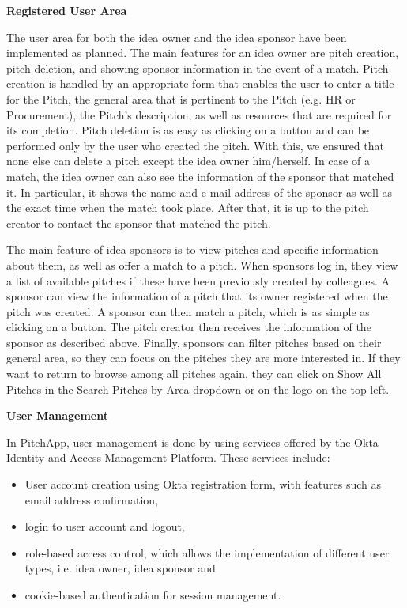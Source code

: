 \textbf{Registered User Area}

The user area for both the idea owner and the idea sponsor have been implemented as planned. The main features for an idea owner are pitch creation, pitch deletion, and showing sponsor information in the event of a match.
Pitch creation is handled by an appropriate form that enables the user to enter a title for the Pitch, the general area that is pertinent to the Pitch (e.g. HR or Procurement), the Pitch’s description, as well as resources that are required for its completion.
Pitch deletion is as easy as clicking on a button and can be performed only by the user who created the pitch. With this, we ensured that none else can delete a pitch except the idea owner him/herself.
In case of a match, the idea owner can also see the information of the sponsor that matched it. In particular, it shows the name and e-mail address of the sponsor as well as the exact time when the match took place. After that, it is up to the pitch creator to contact the sponsor that matched the pitch.

The main feature of idea sponsors is to view pitches and specific information about them, as well as offer a match to a pitch. When sponsors log in, they view a list of available pitches if these have been previously created by colleagues.
A sponsor can view the information of a pitch that its owner registered when the pitch was created. A sponsor can then match a pitch, which is as simple as clicking on a button. The pitch creator then receives the information of the sponsor as described above.
Finally, sponsors can filter pitches based on their general area, so they can focus on the pitches they are more interested in. If they want to return to browse among all pitches again, they can click on Show All Pitches in the Search Pitches by Area dropdown or on the logo on the top left.

\textbf{User Management}

In PitchApp, user management is done by using services offered by the Okta Identity and Access Management Platform. These services include:

\begin{itemize}
	\item User account creation using Okta registration form, with features such as email address confirmation,
	\item login to user account and logout,
	\item role-based access control, which allows the implementation of different user types, i.e. idea owner, idea sponsor and
	\item cookie-based authentication for session management.
\end{itemize}

